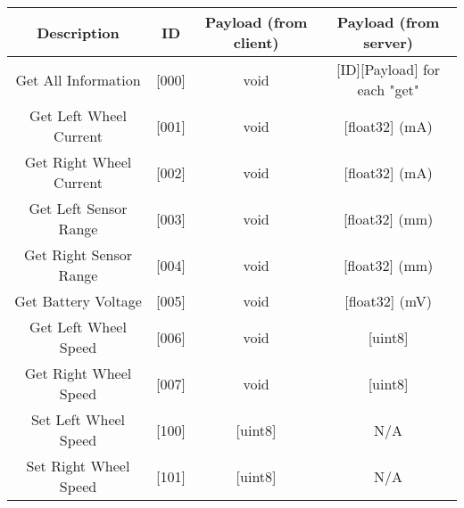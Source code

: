 \begin{table}[!htb]
  \centering
  \renewcommand{\arraystretch}{1.2}
  \begin{tabular}{ |c|c|c|c| }
    \hline
    \textbf{Description}         & \textbf{ID}        & \textbf{Payload (from client)}      & \textbf{Payload (from server)}    \\
    \hline
    Get All Information          & [000]              & void                                & [ID][Payload] for each "get"      \\
    \hline
    Get Left Wheel Current       & [001]              & void                                & [float32] (mA)                    \\
    \hline
    Get Right Wheel Current      & [002]              & void                                & [float32] (mA)                    \\
    \hline
    Get Left Sensor Range        & [003]              & void                                & [float32] (mm)                    \\
    \hline
    Get Right Sensor Range       & [004]              & void                                & [float32] (mm)                    \\
    \hline
    Get Battery Voltage          & [005]              & void                                & [float32] (mV)                    \\
    \hline
    Get Left Wheel Speed         & [006]              & void                                & [uint8]                           \\
    \hline
    Get Right Wheel Speed        & [007]              & void                                & [uint8]                           \\
    \hline
    Set Left Wheel Speed         & [100]              & [uint8]                             & N/A                               \\
    \hline
    Set Right Wheel Speed        & [101]              & [uint8]                             & N/A                               \\
    \hline
  \end{tabular}
  \caption{}
  \label{tab:protocolMessages}
\end{table}
